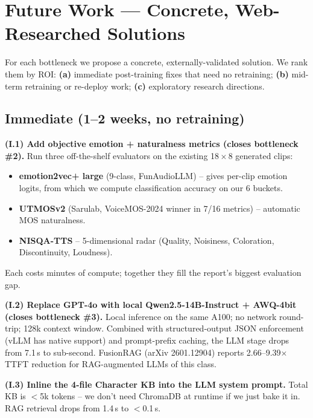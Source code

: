 \documentclass[10pt,a4paper]{article}
\begin{document}
\section{Future Work --- Concrete, Web-Researched Solutions}\label{sec:future}

For each bottleneck we propose a concrete, externally-validated solution.
We rank them by ROI: \textbf{(a)} immediate post-training fixes
that need no retraining; \textbf{(b)} mid-term retraining or re-deploy
work; \textbf{(c)} exploratory research directions.

\subsection{Immediate (1--2 weeks, no retraining)}

\noindent\textbf{(I.1) Add objective emotion + naturalness metrics
(closes bottleneck \#2).}
Run three off-the-shelf evaluators on the existing 18\,$\times$\,8
generated clips:

\begin{itemize}
  \item \textbf{emotion2vec+ large} (9-class, FunAudioLLM) -- gives
        per-clip emotion logits, from which we compute classification
        accuracy on our 6 buckets.
  \item \textbf{UTMOSv2} (Sarulab, VoiceMOS-2024 winner in 7/16 metrics)
        -- automatic MOS naturalness.
  \item \textbf{NISQA-TTS} -- 5-dimensional radar (Quality, Noisiness,
        Coloration, Discontinuity, Loudness).
\end{itemize}

\noindent Each costs minutes of compute; together they fill the report's
biggest evaluation gap.

\noindent\textbf{(I.2) Replace GPT-4o with local Qwen2.5-14B-Instruct
+ AWQ-4bit (closes bottleneck \#3).}
Local inference on the same A100; no network round-trip; 128k context
window. Combined with structured-output JSON enforcement (vLLM has native
support) and prompt-prefix caching, the LLM stage drops from 7.1\,s to
sub-second. FusionRAG (arXiv 2601.12904) reports 2.66--9.39$\times$ TTFT
reduction for RAG-augmented LLMs of this class.

\noindent\textbf{(I.3) Inline the 4-file Character KB into the LLM system
prompt.} Total KB is $<$5k tokens -- we don't need ChromaDB at runtime if
we just bake it in. RAG retrieval drops from 1.4\,s to $<$0.1\,s.
\end{document}
